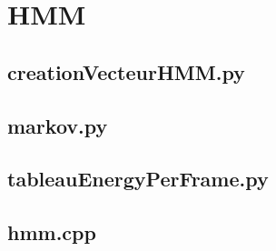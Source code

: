 \chapter{HMM}
	\section{creationVecteurHMM.py}
	
	
	\section{markov.py}
	
	
	\section{tableauEnergyPerFrame.py}
	
	
	\section{hmm.cpp}
	